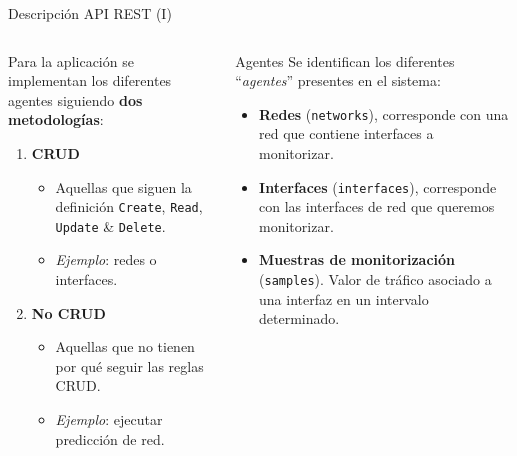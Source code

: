 \documentclass[aspectratio=169,xcolor=dvipsnames]{beamer}
\begin{document}
	\begin{frame}{Descripción API REST (I)}
		\begin{columns}
			\begin{column}{0.5\textwidth}
				Para la aplicación se implementan los diferentes agentes siguiendo \textbf{dos metodologías}: \\
				
				\vspace{12px}
				
				\begin{enumerate}
					\item \textbf{CRUD} 
					\begin{itemize}
						\item Aquellas que siguen la definición \texttt{Create}, \texttt{Read}, \texttt{Update} \& \texttt{Delete}.
						
						\item \textit{Ejemplo}: redes o interfaces.
					\end{itemize}
				
					\item \textbf{No CRUD}
					\begin{itemize}
						\item Aquellas que no tienen por qué seguir las reglas CRUD.
						
						\item \textit{Ejemplo}: ejecutar predicción de red.
					\end{itemize}
				\end{enumerate}
			\end{column}
		
			\begin{column}{0.5\textwidth}
				\begin{alertblock}{Agentes}
					Se identifican los diferentes ``\textit{agentes}'' presentes en el sistema:
					
					\begin{itemize}
						\item \textbf{Redes} (\texttt{networks}), corresponde con una red que contiene interfaces a monitorizar.
						
						\item \textbf{Interfaces} (\texttt{interfaces}), corresponde con las interfaces de red que queremos monitorizar.
						
						\item \textbf{Muestras de monitorización} (\texttt{samples}). Valor de tráfico asociado a una interfaz en un intervalo determinado.
					\end{itemize}
				\end{alertblock}
			\end{column}
		\end{columns}
	\end{frame}
	
\end{document}
